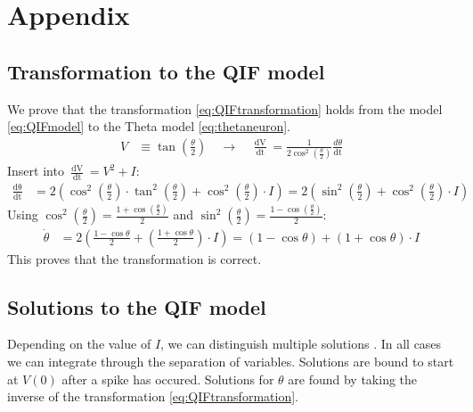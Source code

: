
\newpage
\appendix
\section{Appendix} \label{sec:Appendix}

\subsection{Transformation to the QIF model} \label{app:TransformationToQIF}
We prove that the transformation \eqref{eq:QIFtransformation} holds from the \QIF model \eqref{eq:QIFmodel} to the Theta model \eqref{eq:thetaneuron}.
\begin{align*}
V &\equiv \tan \left( \frac{\theta}{2} \right) \quad \longrightarrow \quad
\frac{\mathop{d V}}{\mathop{d t}} = \frac{1}{2 \cos ^{2}\left(\frac{\theta}{2}\right)} \frac{d \theta}{ \mathop{d t}}
\end{align*}
Insert into $\frac{\mathop{d V}}{\mathop{d t}}= V^2 + I$:
\begin{align*}
\frac{\mathop{d \theta}}{\mathop{d t}} &= 2\left(\cos ^{2}\left(\frac{\theta}{2}\right) \cdot \tan ^{2}\left(\frac{\theta}{2}\right)+\cos ^{2}\left(\frac{\theta}{2}\right) \cdot I \right) = 2\left(\sin ^{2}\left(\frac{\theta}{2}\right)+\cos ^{2}\left(\frac{\theta}{2}\right) \cdot I \right)
\end{align*}
Using $\cos ^{2}\left(\frac{\theta}{2}\right) = \frac{1+\cos \left(\frac{\theta}{2}\right)}{2}$ and $\sin ^{2}\left(\frac{\theta}{2}\right)=\frac{1-\cos \left(\frac{\theta}{2}\right)}{2}$:
\begin{align*}
\dot{\theta} &=2\left(\frac{1-\cos \theta}{2}+\left(\frac{1+\cos \theta}{2}\right) \cdot I \right) =(1-\cos \theta)+(1+\cos \theta) \cdot I
\end{align*}
This proves that the transformation is correct.

 
\subsection{Solutions to the QIF model} \label{app:ThetaModelSolutions}
Depending on the value of $I$, we can distinguish multiple solutions  \cite{Perez2020}. In all cases we can integrate through the separation of variables. Solutions are bound to start at $V(0)$ after a spike has occured. Solutions for $\theta$ are found by taking the inverse of the transformation \eqref{eq:QIFtransformation}.

